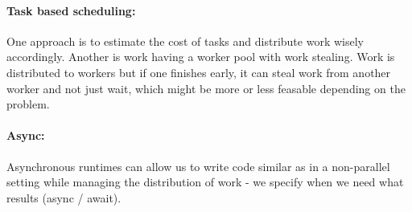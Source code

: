 \paragraph*{Task based scheduling:} One approach is to estimate the cost of tasks and distribute work wisely accordingly.
Another is work having a worker pool with work stealing. Work is distributed to workers
but if one finishes early, it can steal work from another worker and not just wait,
which might be more or less feasable depending on the problem.

\paragraph*{Async:} Asynchronous runtimes can allow us to write code similar as in a non-parallel setting 
while managing the distribution of work - we specify
when we need what results (async / await).


